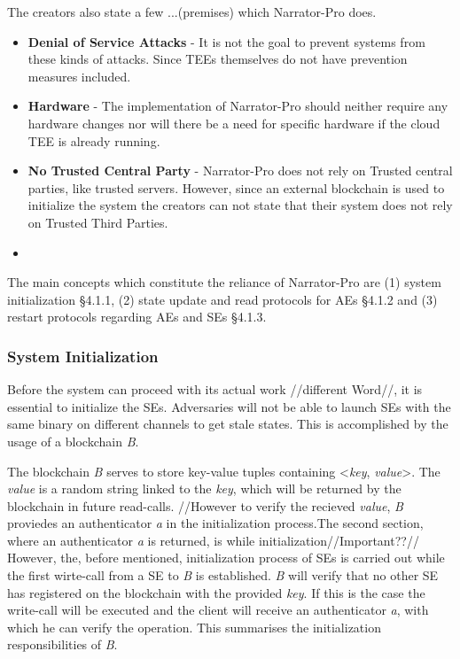 The creators also state a few ...(premises) which Narrator-Pro does. 
\begin{itemize}
    \item \textbf{Denial of Service Attacks} - It is not the goal to prevent systems from these kinds of attacks. Since TEEs themselves do not have prevention measures included.  
    \item \textbf{Hardware} - The implementation of Narrator-Pro should neither require any hardware changes nor will there be a need for specific hardware if the cloud TEE is already running.  
    \item \textbf{No Trusted Central Party} - Narrator-Pro does not rely on Trusted central parties, like trusted servers. However, since an external blockchain is used to initialize the system the creators can not state that their system does not rely on Trusted Third Parties.
    \item \textbf{}
\end{itemize} 

The main concepts which constitute the reliance of Narrator-Pro are (1) system initialization §4.1.1, (2) state update and read protocols for AEs §4.1.2 and (3) restart protocols regarding AEs and SEs §4.1.3.

\subsubsection{System Initialization}

Before the system can proceed with its actual work //different Word//, it is essential to initialize the SEs. Adversaries will not be able to launch SEs with the same binary on different channels to get stale states. This is accomplished by the usage of a blockchain \textit{B}. 

The blockchain \textit{B} serves to store key-value tuples containing <\textit{key}, \textit{value}>. The \textit{value} is a random string linked to the \textit{key}, which will be returned by the blockchain in future read-calls. 
//However to verify the recieved \textit{value}, \textit{B} proviedes an authenticator \textit{a} in the initialization process.The second section, where an authenticator \textit{a} is returned, is while initialization//Important??// 
However, the, before mentioned, initialization process of SEs is carried out while the first wirte-call from a SE to \textit{B} is established. \textit{B} will verify that no other SE has registered on the blockchain with the provided \textit{key}. If this is the case the write-call will be executed and the client will receive an authenticator \textit{a}, with which he can verify the operation. This summarises the initialization responsibilities of \textit{B}.

